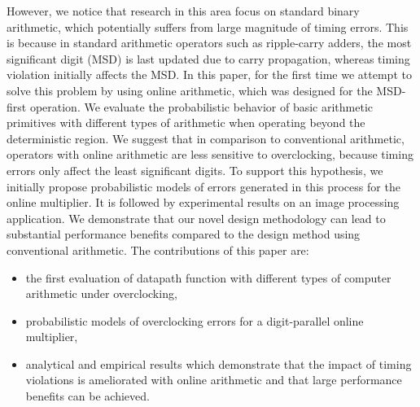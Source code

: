 \documentclass{acm_proc_article-sp}
\begin{document}
However, we notice that research in this area focus on standard binary arithmetic, which potentially suffers from large magnitude of timing errors. This is because in standard arithmetic operators such as ripple-carry adders, the most significant digit (MSD) is last updated due to carry propagation, whereas timing violation initially affects the MSD. In this paper, for the first time we attempt to solve this problem by using online arithmetic, which was designed for the MSD-first operation. We evaluate the probabilistic behavior of basic arithmetic primitives with different types of arithmetic when operating beyond the deterministic region. We suggest that in comparison to conventional arithmetic, operators with online arithmetic are less sensitive to overclocking, because timing errors only affect the least significant digits. To support this hypothesis, we initially propose probabilistic models of errors generated in this process for the online multiplier. It is followed by experimental results on an image processing application. We demonstrate that our novel design methodology can lead to substantial performance benefits compared to the design method using conventional arithmetic. The contributions of this paper are:
%
\begin{itemize}
\vspace{-2ex}
  \item the first evaluation of datapath function with different types of computer arithmetic under overclocking,
  \item probabilistic models of overclocking errors for a digit-parallel online multiplier,
  \item analytical and empirical results which demonstrate that the impact of timing violations is ameliorated with online arithmetic and that large performance benefits can be achieved.
\end{itemize}



 
\end{document}
